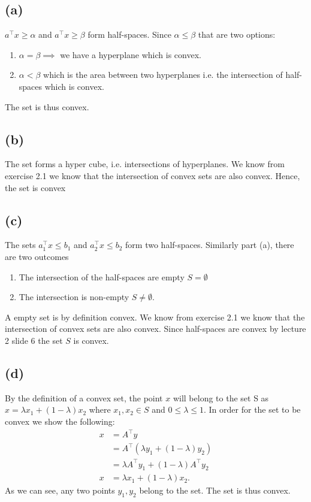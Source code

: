 \documentclass{article}
\begin{document}
	\subsection*{(a)}
		$a^\top x \geq \alpha$ and $a^\top x \geq \beta$ form half-spaces. Since $\alpha\leq\beta$ that are two options:
		\begin{enumerate}
			\item $\alpha = \beta \implies $ we have a hyperplane which is convex.
			\item $\alpha < \beta$ which is the area between two hyperplanes i.e. the intersection of half-spaces which is convex.
		\end{enumerate}	
		The set is thus convex.
	\subsection*{(b)}
		The set forms a hyper cube, i.e. intersections of hyperplanes. We know from exercise 2.1 we know that the intersection of convex sets are also convex. Hence, the set is convex
	\subsection*{(c)}
		The sets $a_1^\top x\leq b_1$ and $a_2^\top x\leq b_2$ form two half-spaces. Similarly part (a), there are two outcomes
		\begin{enumerate}
			\item The intersection of the half-spaces are empty $S=\emptyset$
			\item The intersection is non-empty $S\neq\emptyset$.
		\end{enumerate}
		A empty set is by definition convex. We know from exercise 2.1 we know that the intersection of convex sets are also convex. Since half-spaces are convex by lecture 2 slide 6 the set $S$ is convex.
	\subsection*{(d)}
		By the definition of a convex set, the point $x$ will belong to the set S as $x = \lambda x_1 + (1-\lambda) x_2$ where $x_1,x_2 \in S$ and $0 \leq \lambda \leq 1. $
		In order for the set to be convex we show the following:
		\begin{align}
			x&= A^\top y \\
			 &= A^\top(\lambda y_1 + (1-\lambda)y_2) \\
			 &= \lambda A^\top y_1 + (1-\lambda)A^\top y_2 \\
			x &= \lambda x_1 + (1-\lambda)x_2.
		\end{align}
		As we can see, any two points $y_1,y_2$ belong to the set. The set is thus convex.
		
\end{document}
